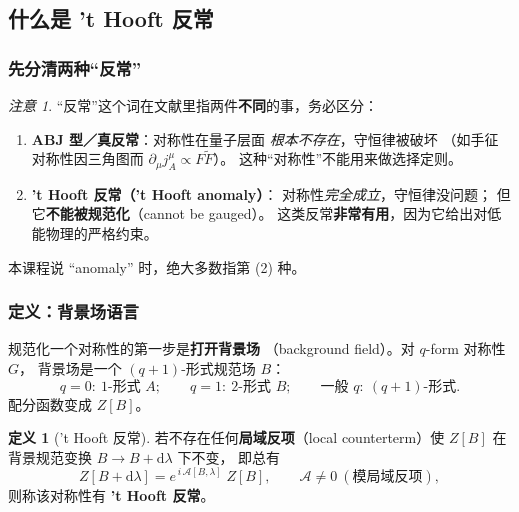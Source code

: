 \documentclass[UTF8,a4paper,11pt]{ctexart}
\theoremstyle{plain}
\theoremstyle{definition}
\newtheorem{definition}{定义}[section]
\theoremstyle{remark}
\newtheorem{warning}{注意}[section]
\newcommand{\ext}{\mathrm{d}}          %
\newcommand{\en}[1]{\textsf{#1}}       %
\begin{document}
\subsection{什么是 't Hooft 反常}
\label{subsec:thooft}

\subsubsection{先分清两种“反常”}

\begin{warning}
\label{warn:twoanomalies}
“反常”这个词在文献里指两件\textbf{不同}的事，务必区分：
\begin{enumerate}[label=(\arabic*)]
  \item \textbf{ABJ 型／真反常}：对称性在量子层面
        \emph{根本不存在}，守恒律被破坏
        （如手征对称性因三角图而 $\partial_\mu j^\mu_A\propto F\tilde F$）。
        这种“对称性”不能用来做选择定则。
  \item \textbf{'t Hooft 反常（\en{'t Hooft anomaly}）}：
        对称性\emph{完全成立}，守恒律没问题；
        但它\textbf{不能被规范化}（\en{cannot be gauged}）。
        这类反常\textbf{非常有用}，因为它给出对低能物理的严格约束。
\end{enumerate}
本课程说 “anomaly” 时，绝大多数指第 (2) 种。
\end{warning}

\subsubsection{定义：背景场语言}

规范化一个对称性的第一步是\textbf{打开背景场}
（\en{background field}）。对 $q$-form 对称性 $G$，
背景场是一个 $(q+1)$-形式规范场 $B$：
\begin{equation}
  q=0:\ \text{1-形式 }A;\qquad
  q=1:\ \text{2-形式 }B;\qquad
  \text{一般 } q:\ (q+1)\text{-形式} .
\end{equation}
配分函数变成 $Z[B]$。

\begin{definition}['t Hooft 反常]
\label{def:thooft}
若不存在任何\textbf{局域反项}（\en{local counterterm}）使
$Z[B]$ 在背景规范变换 $B\to B+\ext\lambda$ 下不变，
即总有
\begin{equation}
  Z[B+\ext\lambda]=e^{\,i\,\mathcal A[B,\lambda]}\;Z[B],
  \qquad \mathcal A\ne0\ (\text{模局域反项}),
  \label{eq:anomalyphase}
\end{equation}
则称该对称性有 \textbf{'t Hooft 反常}。
\end{definition}
\end{document}
